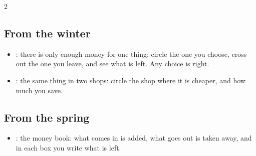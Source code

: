 {\begin{multicols}{2}
\subsection*{From the winter}
\begin{itemize}[leftmargin=5mm, itemsep=1pt, topsep=0pt]
\item \textbf{\lblElige}: there is only enough money for one thing:
  circle the one you choose, cross out the one you leave, and see what
  is left. Any choice is right.
\item \textbf{\lblCompara}: the same thing in two shops: circle the shop
  where it is cheaper, and how much you save.
\end{itemize}
\subsection*{From the spring}
\begin{itemize}[leftmargin=5mm, itemsep=1pt, topsep=0pt]
\item \textbf{\lblCuentas}: the money book: what comes in is added,
  what goes out is taken away, and in each box you write what is left.
\end{itemize}
\end{multicols}}
\newpage

